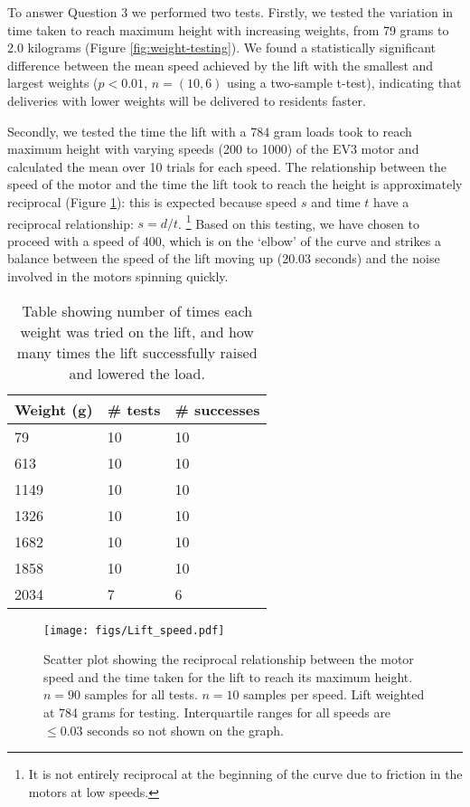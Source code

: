 \documentclass{article}
\begin{document}
To answer Question 3 we performed two tests. Firstly, we tested the variation in time taken to reach maximum height with increasing weights, from 79 grams to 2.0 kilograms (Figure \ref{fig:weight-testing}). We found a statistically significant difference between the mean speed achieved by the lift with the smallest and largest weights ($p < 0.01$, $n = (10, 6)$ using a two-sample t-test), indicating that deliveries with lower weights will be delivered to residents faster. 

Secondly, we tested the time the lift with a 784 gram loads took to reach maximum height with varying speeds (200 to 1000) of the EV3 motor and calculated the mean over 10 trials for each speed. The relationship between the speed of the motor and the time the lift took to reach the height is approximately reciprocal (Figure \ref{fig:speed-testing}): this is expected because speed $s$ and time $t$ have a reciprocal relationship: $s = d / t$. \footnote{It is not entirely reciprocal at the beginning of the curve due to friction in the motors at low speeds.} Based on this testing, we have chosen to proceed with a speed of 400, which is on the `elbow' of the curve and strikes a balance between the speed of the lift moving up (20.03 seconds) and the noise involved in the motors spinning quickly.

\begin{table}
  \begin{center}
    \begin{tabular}{lll}
      {\bf Weight (g)} & {\bf \# tests} & {\bf \# successes} \\
      \hline
      79 &   10 & 10 \\
      613 &  10 & 10 \\
      1149 & 10 & 10 \\
      1326 & 10 & 10 \\
      1682 & 10 & 10 \\
      1858 & 10 & 10 \\
      2034 & 7 & 6
    \end{tabular}
    \caption{Table showing number of times each weight was tried on the lift, and how many times the lift successfully raised and lowered the load. }
    \label{tab:weight}
  \end{center}
\end{table}

\begin{figure}
  \begin{center}
    \texttt{[image: figs/Lift\_speed.pdf]}
    \caption{Scatter plot showing the reciprocal relationship between the motor speed and the time taken for the lift to reach its maximum height. $n = 90$ samples for all tests. $n = 10$ samples per speed. Lift weighted at 784 grams for testing. Interquartile ranges for all speeds are $\leq 0.03 \text{ seconds}$ so not shown on the graph.}
  \label{fig:speed-testing}
  \end{center}
\end{figure}
\end{document}
